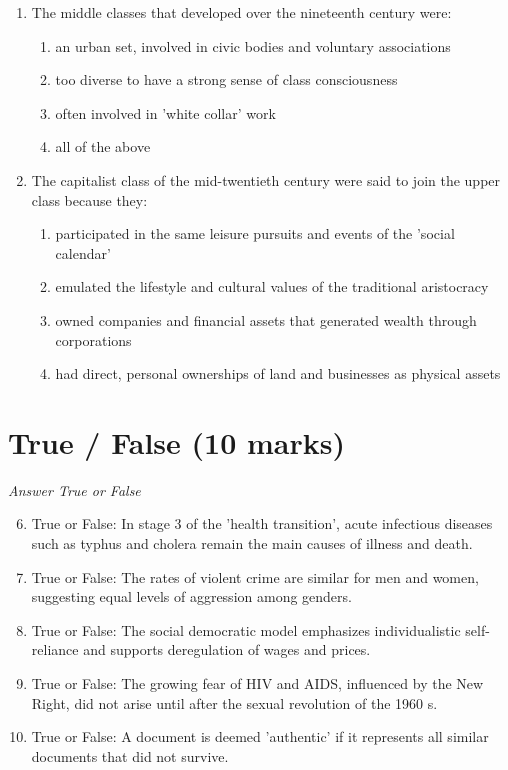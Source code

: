 \documentclass[12pt]{article}
\begin{document}
\begin{enumerate}[label=\arabic*.]
\begin{enumerate}[label=(\alph*)]
\end{enumerate}
\item The middle classes that developed over the nineteenth century were:
\begin{enumerate}[label=(\alph*)]
    \item an urban set, involved in civic bodies and voluntary associations
    \item too diverse to have a strong sense of class consciousness
    \item often involved in 'white collar' work
    \item all of the above
\end{enumerate}
\item The capitalist class of the mid-twentieth century were said to join the upper class because they:
\begin{enumerate}[label=(\alph*)]
    \item participated in the same leisure pursuits and events of the 'social calendar'
    \item emulated the lifestyle and cultural values of the traditional aristocracy
    \item owned companies and financial assets that generated wealth through corporations
    \item had direct, personal ownerships of land and businesses as physical assets
\end{enumerate}
\end{enumerate}

\section*{True / False (10 marks)}
\textit{Answer True or False}
\begin{enumerate}[label=\arabic*.]
\setcounter{enumi}{5}
\item True or False: In stage 3 of the 'health transition', acute infectious diseases such as typhus and cholera remain the main causes of illness and death.
\item True or False: The rates of violent crime are similar for men and women, suggesting equal levels of aggression among genders.
\item True or False: The social democratic model emphasizes individualistic self-reliance and supports deregulation of wages and prices.
\item True or False: The growing fear of HIV and AIDS, influenced by the New Right, did not arise until after the sexual revolution of the 1960 s.
\item True or False: A document is deemed 'authentic' if it represents all similar documents that did not survive.
\end{enumerate}
\end{document}
